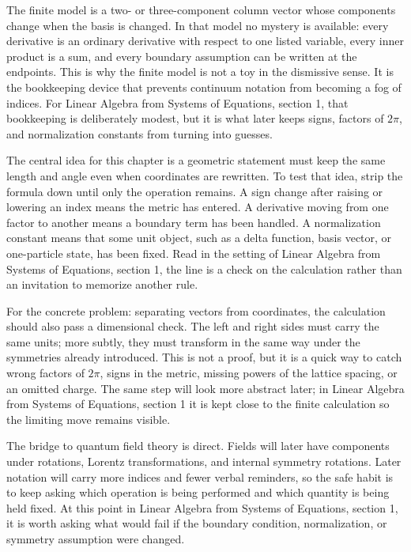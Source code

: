 The finite model is a two- or three-component column vector whose components change when the basis is changed.  In that model no mystery is available: every derivative is an ordinary derivative with respect to one listed variable, every inner product is a sum, and every boundary assumption can be written at the endpoints.  This is why the finite model is not a toy in the dismissive sense.  It is the bookkeeping device that prevents continuum notation from becoming a fog of indices.  For Linear Algebra from Systems of Equations, section 1, that bookkeeping is deliberately modest, but it is what later keeps signs, factors of \(2\pi\), and normalization constants from turning into guesses.

The central idea for this chapter is a geometric statement must keep the same length and angle even when coordinates are rewritten.  To test that idea, strip the formula down until only the operation remains.  A sign change after raising or lowering an index means the metric has entered.  A derivative moving from one factor to another means a boundary term has been handled.  A normalization constant means that some unit object, such as a delta function, basis vector, or one-particle state, has been fixed.  Read in the setting of Linear Algebra from Systems of Equations, section 1, the line is a check on the calculation rather than an invitation to memorize another rule.

For the concrete problem: separating vectors from coordinates, the calculation should also pass a dimensional check.  The left and right sides must carry the same units; more subtly, they must transform in the same way under the symmetries already introduced.  This is not a proof, but it is a quick way to catch wrong factors of \(2\pi\), signs in the metric, missing powers of the lattice spacing, or an omitted charge.  The same step will look more abstract later; in Linear Algebra from Systems of Equations, section 1 it is kept close to the finite calculation so the limiting move remains visible.

The bridge to quantum field theory is direct.  Fields will later have components under rotations, Lorentz transformations, and internal symmetry rotations.  Later notation will carry more indices and fewer verbal reminders, so the safe habit is to keep asking which operation is being performed and which quantity is being held fixed.  At this point in Linear Algebra from Systems of Equations, section 1, it is worth asking what would fail if the boundary condition, normalization, or symmetry assumption were changed.

